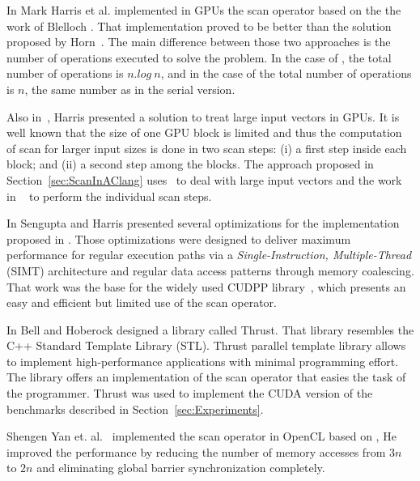 \documentclass[Ingles]{ic-tese-v1}
\newcommand{\rsec}[1]{Section~\ref{sec:#1}}
\begin{document}
In \cite{harris2007parallel} Mark Harris  et al.  implemented in GPUs the scan
operator     based     on     the     the     work     of     Blelloch
\cite{ScanAsPrimitive}. That  implementation proved to be  better than
the solution  proposed by  Horn~\cite{GPUGems2}.  The  main difference
between those two  approaches is the number of  operations executed to
solve the problem. In the case of \cite{GPUGems2}, the total number of
operations is $n.log\ n$, and in the case of \cite{harris2007parallel}
the  total number  of operations  is $n$,  the same  number as  in the
serial version.

Also  in~\cite{harris2007parallel},  Harris  presented a  solution  to
treat large input vectors in GPUs.  It  is well known that the size of
one GPU block  is limited and thus the computation  of scan for larger
input sizes is  done in two scan  steps: (i) a first  step inside each
block; and (ii) a second step among the blocks.  The approach proposed
in  \rsec{ScanInAClang}  uses~\cite{harris2007parallel} to  deal  with
large input vectors and the work in ~\cite{ScanAsPrimitive} to perform
the individual scan steps.

In   \cite{Sengupta:2008}  Sengupta   and  Harris   presented  several
optimizations     for      the     implementation      proposed     in
\cite{harris2007parallel}.   Those  optimizations   were  designed  to
deliver  maximum  performance  for   regular  execution  paths  via  a
\textit{Single-Instruction,  Multiple-Thread} (SIMT)  architecture and
regular data access patterns through memory coalescing.  That work was
the  base  for  the  widely  used  CUDPP  library~\cite{CUDPP},  which
presents an easy and efficient but limited use of the scan operator.

In  \cite{Nathan:2011} Bell  and  Hoberock designed  a library  called
Thrust.   That library  resembles  the C++  Standard Template  Library
(STL).   Thrust  parallel   template  library   allows  to   implement
high-performance  applications with  minimal  programming effort.  The
library offers an implementation of the scan operator that easies the task of
the programmer.  Thrust  was used  to implement  the CUDA version of the
benchmarks described in \rsec{Experiments}.

Shengen Yan et.  al.~\cite{Yan:2013}  implemented the scan operator in
OpenCL based on \cite{harris2007parallel},  He improved the performance
by  reducing the  number  of memory  accesses from  $3n$  to $2n$  and
eliminating global barrier synchronization completely.
\end{document}
